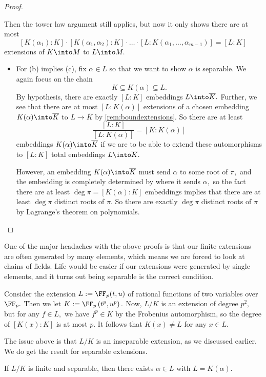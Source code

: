 \documentclass[../notes.tex]{subfiles}
\begin{document}
\begin{proof}
\begin{remark}
		Then the tower law argument still applies, but now it only shows there are at most
		\[[K(\alpha_1):K]\cdot[K(\alpha_1,\alpha_2):K]\cdot\ldots\cdot[L:K(\alpha_1,\ldots,\alpha_{m-1})]=[L:K]\]
		extensions of $K\into M$ to $L\into M.$
	\end{remark}
	\begin{itemize}
		\item For (b) implies (c), fix $\alpha\in L$ so that we want to show $\alpha$ is separable. We again focus on the chain
		\[K\subseteq K(\alpha)\subseteq L.\]
		By hypothesis, there are exactly $[L:K]$ embeddings $L\into\overline K.$ Further, we see that there are at most $[L:K(\alpha)]$ extensions of a chosen embedding $K(\alpha)\into\overline K$ to $L\to\overline K$ by \autoref{rem:boundextensions}. So there are at least
		\[\frac{[L:K]}{[L:K(\alpha)]}=[K:K(\alpha)]\]
		embeddings $K(\alpha)\into\overline K$ if we are to be able to extend these automorphisms to $[L:K]$ total embeddings $L\into\overline K.$
		
		However, an embedding $K(\alpha)\into\overline K$ must send $\alpha$ to some root of $\pi,$ and the embedding is completely determined by where it sends $\alpha,$ so the fact there are at least $\deg\pi=[K(\alpha):K]$ embeddings implies that there are at least $\deg\pi$ distinct roots of $\pi.$ So there are exactly $\deg\pi$ distinct roots of $\pi$ by Lagrange's theorem on polynomials.
		\qedhere
	\end{itemize}
\end{proof}
One of the major headaches with the above proofs is that our finite extensions are often generated by many elements, which means we are forced to look at chains of fields. Life would be easier if our extensions were generated by single elements, and it turns out being separable is the correct condition.
\begin{nex}
	Consider the extension $L:=\FF_p(t,u)$ of rational functions of two variables over $\FF_p.$ Then we let $K:=\FF_p\left(t^p,u^p\right).$ Now, $L/K$ is an extension of degree $p^2,$ but for any $f\in L,$ we have $f^p\in K$ by the Frobenius automorphism, so the degree of $[K(x):K]$ is at most $p.$ It follows that $K(x)\ne L$ for any $x\in L.$
\end{nex}
The issue above is that $L/K$ is an inseparable extension, as we discussed earlier. We do get the result for separable extensions.
\begin{theorem}
	If $L/K$ is finite and separable, then there exists $\alpha\in L$ with $L=K(\alpha).$
\end{theorem}
\end{document}
